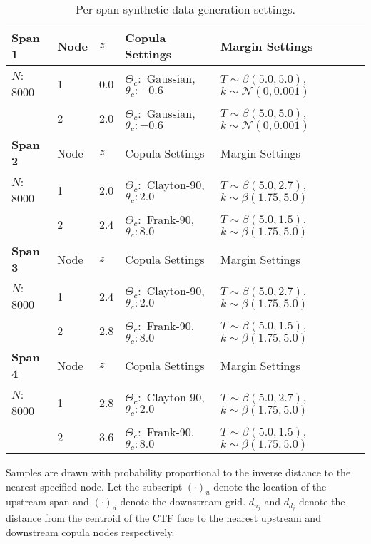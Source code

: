 \begin{table}[h]
    \begin{center}
        \caption{Per-span synthetic data generation settings.}
        \begin{tabular}{|l|l|l|l|l|}
            \hline
            \bf Span 1 & Node & $z$ & Copula Settings  & Margin Settings \\
            \hline
            $N$: 8000  & 1  & 0.0 & $\Theta_c:$ Gaussian, $\theta_c:-0.6$ &  $T\sim\beta(5.0, 5.0)$,$k\sim\mathcal{N}(0, 0.001)$ \\
                   & 2  & 2.0 & $\Theta_c:$ Gaussian, $\theta_c:-0.6$ &  $T\sim\beta(5.0, 5.0)$, $k\sim\mathcal{N}(0, 0.001)$   \\
            \hline \hline
            \bf Span 2 & Node & $z$ & Copula Settings  & Margin Settings \\
            \hline
             $N$: 8000 & 1  & 2.0 & $\Theta_c:$ Clayton-90, $\theta_c: 2.0$ &  $T\sim\beta(5.0, 2.7)$, $k\sim\beta(1.75, 5.0)$ \\
            & 2  & 2.4 & $\Theta_c:$ Frank-90, $\theta_c: 8.0$ &  $T\sim\beta(5.0, 1.5)$, $k\sim\beta(1.75, 5.0)$   \\
            \hline \hline
            \bf Span 3 & Node & $z$ & Copula Settings  & Margin Settings \\
            \hline
             $N$: 8000 & 1  & 2.4 & $\Theta_c:$ Clayton-90, $\theta_c: 2.0$ &  $T\sim\beta(5.0, 2.7)$, $k\sim\beta(1.75, 5.0)$ \\
            & 2  & 2.8 & $\Theta_c:$ Frank-90, $\theta_c: 8.0$ &  $T\sim\beta(5.0, 1.5)$, $k\sim\beta(1.75, 5.0)$   \\
            \hline \hline
            \bf Span 4 & Node & $z$ & Copula Settings  & Margin Settings \\
            \hline
            $N$: 8000 & 1  & 2.8 & $\Theta_c:$ Clayton-90, $\theta_c: 2.0$ &  $T\sim\beta(5.0, 2.7)$, $k\sim\beta(1.75, 5.0)$ \\
            & 2  & 3.6 & $\Theta_c:$ Frank-90, $\theta_c: 8.0$ &  $T\sim \beta(5.0, 1.5)$, $k\sim\beta(1.75, 5.0)$   \\
            \hline
        \end{tabular}
        \label{tab:synth_settings}
    \end{center}
\end{table}

Samples are drawn with probability proportional to the inverse distance to the nearest specified node.
Let the subscript $(\cdot)_u$ denote the location of the upstream span and $(\cdot)_d$ denote the downstream grid. $d_{u_j}$ and  $d_{d_j}$ denote the distance from the centroid of the CTF face to the nearest upstream and downstream copula nodes respectively.  


